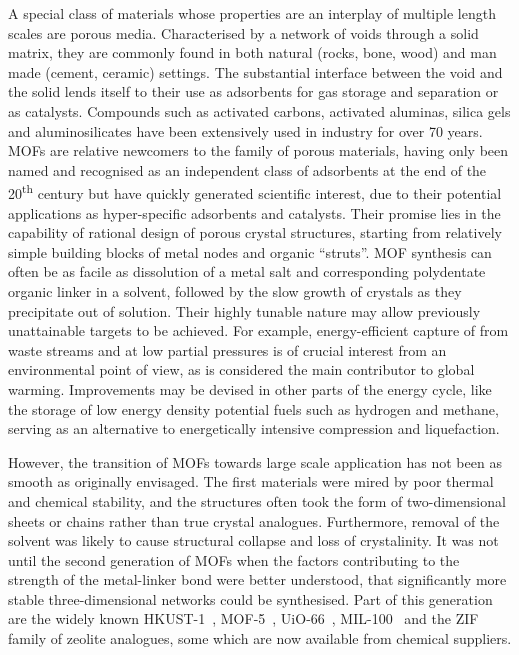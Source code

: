 A special class of materials whose properties are an interplay 
of multiple length scales are porous media. Characterised by
a network of voids through a solid matrix, they are 
commonly found in both natural (rocks, bone, wood) and man made 
(cement, ceramic) settings. The substantial interface between the
void and the solid lends itself to their use as adsorbents 
for gas storage and separation or as catalysts. Compounds such as 
activated carbons, activated aluminas, silica gels and aluminosilicates
have been extensively used in industry for over 70 years.
\glspl{MOF} are relative newcomers to the 
family of porous materials, having only been named and 
recognised as an independent class of adsorbents at the end of
the 20\textsuperscript{th} century but
have quickly generated scientific interest, due to their
potential applications as hyper-specific adsorbents and catalysts.
Their promise lies in the capability of rational design of 
porous crystal structures, starting from relatively simple building
blocks of metal nodes and organic ``struts''. \gls{MOF} synthesis can often
be as facile as dissolution of a metal salt and corresponding
polydentate organic linker in a solvent, followed by the slow 
growth of crystals as they precipitate out of solution.
Their highly tunable nature may allow previously unattainable
targets to be achieved. For example, energy-efficient capture of 
 from waste streams and at low partial pressures is of
crucial interest  from an environmental point of view, as  
is considered the main contributor to global warming. Improvements may 
be devised in other parts of the energy cycle, like the storage of low
energy density potential fuels such as hydrogen and methane, serving as an 
alternative to energetically intensive compression and liquefaction.

However, the transition of \glspl{MOF} towards large scale application 
has not been as smooth as originally envisaged. The first materials
were mired by poor thermal and chemical stability, and the structures 
often took the form of two-dimensional sheets or chains rather than
true crystal analogues. Furthermore, removal of the solvent was likely
to cause structural collapse and loss of crystalinity. It was not until
the second generation of \glspl{MOF} when the factors contributing to 
the strength of the metal-linker bond were better understood, that
significantly more stable three-dimensional networks could be synthesised.
Part of this generation are the widely known 
HKUST-1~\cite{chuiChemicallyFunctionalizableNanoporous1999}, 
MOF-5~\cite{rosiHydrogenStorageMicroporous2003},
UiO-66~\cite{cavkaNewZirconiumInorganic2008},
MIL-100~\cite{fereyChromiumTerephthalateBasedSolid2005}
and the ZIF~\cite{huangLigandDirectedStrategyZeoliteType2006} 
family of zeolite analogues, some which are now available from chemical
suppliers.

